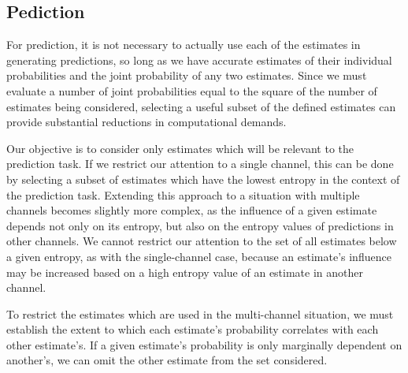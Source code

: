 \documentclass[10pt]{article}
\begin{document}
\subsection{Pediction}
For prediction, it is not necessary to actually use each of the estimates in generating predictions, so long as we have accurate estimates of their individual probabilities and the joint probability of any two estimates.  Since we must evaluate a number of joint probabilities equal to the square of the number of estimates being considered, selecting a useful subset of the defined estimates can provide substantial reductions in computational demands.

Our objective is to consider only estimates which will be relevant to the prediction task.  If we restrict our attention to a single channel, this can be done by selecting a subset of estimates which have the lowest entropy in the context of the prediction task.  Extending this approach to a situation with multiple channels becomes slightly more complex, as the influence of a given estimate depends not only on its entropy, but also on the entropy values of predictions in other channels.  We cannot restrict our attention to the set of all estimates below a given entropy, as with the single-channel case, because an estimate's influence may be increased based on a high entropy value of an estimate in another channel.

To restrict the estimates which are used in the multi-channel situation, we must establish the extent to which each estimate's probability correlates with each other estimate's.  If a given estimate's probability is only marginally dependent on another's, we can omit the other estimate from the set considered.
\end{document}
